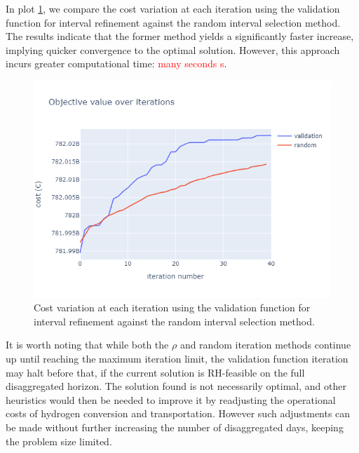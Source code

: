 \documentclass[smallextended,natbib]{svjour3}       %
\numberwithin{theorem}{section}
\begin{document}
In plot \ref{fig:val_vs_average}, we compare the cost variation at each iteration using the validation function for interval refinement against the random interval selection method. 
The results indicate that the former method yields a significantly faster increase, implying quicker convergence to the optimal solution. 
However, this approach incurs greater computational time: \textcolor{red}{many seconds s}. 
\begin{figure}[htbp]
  \centering
  \includegraphics[width=\textwidth]{images/val_vs_average.png}
  \caption{Cost variation at each iteration using the validation function for interval refinement against the random interval selection method.}
  \label{fig:val_vs_average}
\end{figure}

It is worth noting that while both the \(\rho\) and random iteration methods continue up until reaching the maximum iteration limit, the validation function iteration may halt before that, if the current solution is RH-feasible on the full disaggregated horizon.
The solution found is not necessarily optimal, and other heuristics would then be needed to improve it by readjusting the operational costs of hydrogen conversion and transportation. 
However such adjustments can be made without further increasing the number of disaggregated days, keeping the problem size limited.
\end{document}
